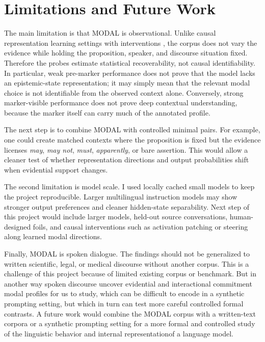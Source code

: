 \documentclass{article}
\begin{document}
\section{Limitations and Future Work}

The main limitation is that MODAL is observational. Unlike causal representation learning settings with interventions \citep{lippe2022citris}, the corpus does not vary the evidence while holding the proposition, speaker, and discourse situation fixed. Therefore the probes estimate statistical recoverability, not causal identifiability. In particular, weak pre-marker performance does not prove that the model lacks an epistemic-state representation; it may simply mean that the relevant modal choice is not identifiable from the observed context alone. Conversely, strong marker-visible performance does not prove deep contextual understanding, because the marker itself can carry much of the annotated profile.

The next step is to combine MODAL with controlled minimal pairs. For example, one could create matched contexts where the proposition is fixed but the evidence licenses \emph{may}, \emph{may not}, \emph{must}, \emph{apparently}, or bare assertion. This would allow a cleaner test of whether representation directions and output probabilities shift when evidential support changes.

The second limitation is model scale. I used locally cached small models to keep the project reproducible. Larger multilingual instruction models may show stronger output preferences and cleaner hidden-state separability. Next step of this project would include larger models, held-out source conversations, human-designed foils, and causal interventions such as activation patching or steering along learned modal directions.

Finally, MODAL is spoken dialogue. The findings should not be generalized to written scientific, legal, or medical discourse without another corpus. This is a challenge of this project because of limited existing corpus or benchmark. But in another way spoken discourse uncover evidential and interactional commitment modal profiles for us to study, which can be difficult to encode in a synthetic prompting setting, but which in turn can test more careful controlled formal contrasts. A future work would combine the MODAL corpus with a written-text corpora or a synthetic prompting setting for a more formal and controlled study of the linguistic behavior and internal representationof a language model.
\end{document}
